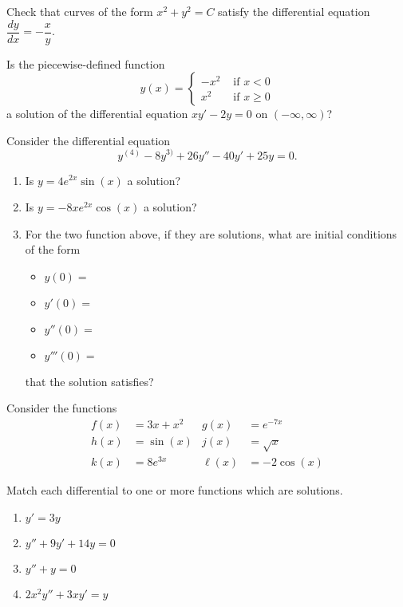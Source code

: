 \begin{exercises}
	\begin{problist}
	\prob Check that curves of the form $x^2 + y^2 = C$ satisfy the differential equation $\dfrac{dy}{dx} = -\dfrac{x}{y}$.
	
	
	\prob Is the piecewise-defined function
	$$
	y(x) = \begin{cases}
 		-x^2 & \text{ if } x< 0 \\
 		x^2 & \text{ if } x \geq 0		
	\end{cases}
	$$
	a solution of the differential equation $xy'-2y=0$ on $(-\infty,\infty)$?
	
	
	\prob Consider the differential equation
	$$ y^{(4)} - 8y^{3)} + 26 y'' - 40y'+25y=0.$$
	
	\begin{enumerate}
		\item Is $y=4 e^{2x}\sin(x)$ a solution?
		\item Is $y=-8 x e^{2x}\cos(x)$ a solution?
		\item For the two function above, if they are solutions, what are initial conditions of the form
			\begin{itemize}
				 \item[] $y(0) =$
				 \item[] $y'(0) =$
				 \item[] $y''(0) =$
				 \item[] $y'''(0) =$
			\end{itemize}
			that the solution satisfies?
	\end{enumerate}


	\prob Consider the functions
	\begin{align*}
		f(x) & = 3x + x^2 	& g(x) & = e^{-7x} \\
		h(x) & = \sin(x) 	& j(x) & = \sqrt{x} \\
		k(x) & = 8 e^{3x}	& \ell(x) & = -2 \cos(x)
	\end{align*}
	
	Match each differential to one or more functions which are solutions.
	
	\begin{enumerate}
		\item $y'=3y$
		\item $y''+9y'+14y=0$
		\item $y''+y=0$
		\item $2x^2y'' + 3xy'=y$
	\end{enumerate}
	
	
	

\end{problist}
\end{exercises}
